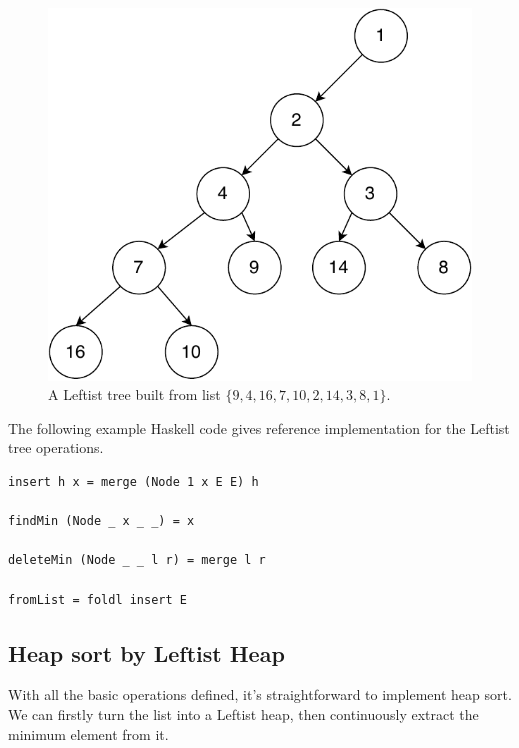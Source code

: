\documentclass[b5paper]{article}
\begin{document}
\begin{figure}[htbp]
   \begin{center}
   	  \includegraphics[scale=0.5]{img/leftist-tree}
    \caption{A Leftist tree built from list $\{9, 4, 16, 7, 10, 2, 14, 3, 8, 1\}$.}
    \label{fig:leftist-tree}
   \end{center}
\end{figure}

The following example Haskell code gives reference implementation
for the Leftist tree operations.

\lstset{language=Haskell}
\begin{lstlisting}
insert h x = merge (Node 1 x E E) h

findMin (Node _ x _ _) = x

deleteMin (Node _ _ l r) = merge l r

fromList = foldl insert E
\end{lstlisting}

\subsection{Heap sort by Leftist Heap}

With all the basic operations defined, it's straightforward to
implement heap sort. We can firstly turn the list into a Leftist
heap, then continuously extract the minimum
element from it.
\end{document}
